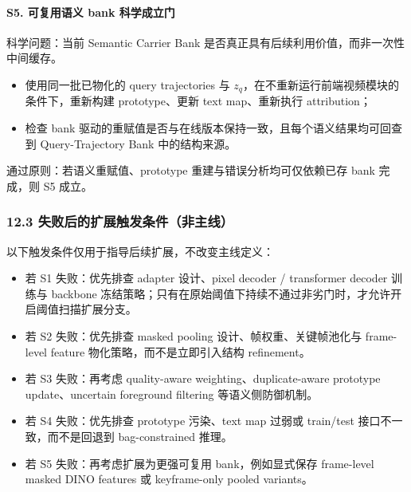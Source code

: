 \documentclass[UTF8]{ctexart}
\begin{document}
\paragraph{S5. 可复用语义 bank 科学成立门}
科学问题：当前 Semantic Carrier Bank 是否真正具有后续利用价值，而非一次性中间缓存。
\begin{itemize}
\item 使用同一批已物化的 query trajectories 与 $z_q$，在不重新运行前端视频模块的条件下，重新构建 prototype、更新 text map、重新执行 attribution；
\item 检查 bank 驱动的重赋值是否与在线版本保持一致，且每个语义结果均可回查到 Query-Trajectory Bank 中的结构来源。
\end{itemize}
通过原则：若语义重赋值、prototype 重建与错误分析均可仅依赖已存 bank 完成，则 S5 成立。

\subsubsection*{12.3 失败后的扩展触发条件（非主线）}
以下触发条件仅用于指导后续扩展，不改变主线定义：
\begin{itemize}
\item 若 S1 失败：优先排查 adapter 设计、pixel decoder / transformer decoder 训练与 backbone 冻结策略；只有在原始阈值下持续不通过非劣门时，才允许开启阈值扫描扩展分支。
\item 若 S2 失败：优先排查 masked pooling 设计、帧权重、关键帧池化与 frame-level feature 物化策略，而不是立即引入结构 refinement。
\item 若 S3 失败：再考虑 quality-aware weighting、duplicate-aware prototype update、uncertain foreground filtering 等语义侧防御机制。
\item 若 S4 失败：优先排查 prototype 污染、text map 过弱或 train/test 接口不一致，而不是回退到 bag-constrained 推理。
\item 若 S5 失败：再考虑扩展为更强可复用 bank，例如显式保存 frame-level masked DINO features 或 keyframe-only pooled variants。
\end{itemize}
\end{document}
